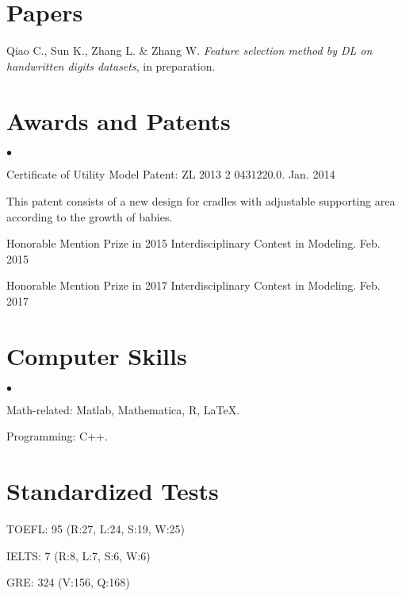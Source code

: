 \documentclass[margin,line]{res}
\newenvironment{list1}{
  \begin{list}{\ding{113}}{%
      \setlength{\itemsep}{0in}
      \setlength{\parsep}{0in} \setlength{\parskip}{0in}
      \setlength{\topsep}{0in} \setlength{\partopsep}{0in} 
      \setlength{\leftmargin}{0.17in}}}{\end{list}}
\newenvironment{list2}{
  \begin{list}{$\bullet$}{%
      \setlength{\itemsep}{0in}
      \setlength{\parsep}{0in} \setlength{\parskip}{0in}
      \setlength{\topsep}{0in} \setlength{\partopsep}{0in} 
      \setlength{\leftmargin}{0.2in}}}{\end{list}}
\begin{document}
\begin{resume}
\section{\sc Papers} 
\begin{list1}
\item[] Qiao C., Sun K., Zhang L. \& Zhang W. \textit{Feature selection method by DL on handwritten digits datasets}, in preparation.
\end{list1}

\section{\sc Awards and Patents} 
\begin{list2}
\item Certificate of Utility Model Patent: ZL 2013 2 0431220.0. \hfill { Jan. 2014}

\begin{list1}
\item[] This patent consists of a new design for cradles with adjustable supporting area according to the growth of babies. 
\end{list1}

\item Honorable Mention Prize in 2015 Interdisciplinary Contest in Modeling. \hfill { Feb. 2015}

\item Honorable Mention Prize in 2017 Interdisciplinary Contest in Modeling. \hfill { Feb. 2017}
\end{list2}


\section{\sc Computer Skills} 
\begin{list2}
\item Math-related:  Matlab, Mathematica, R, \LaTeX.
\item Programming:  C++.
\end{list2}

\section{\sc Standardized Tests}
\begin{list1}
\item[] TOEFL: 95  (R:27, L:24, S:19, W:25) 
\item[] IELTS: 7  (R:8, L:7, S:6, W:6) 
\item[] GRE: 324 (V:156, Q:168)
\end{list1}
\fi

\end{resume}
\end{document}
